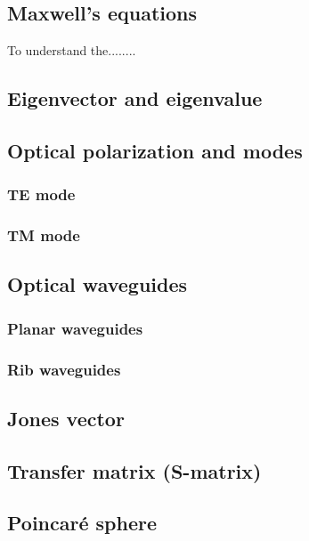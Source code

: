 \documentclass[../report.tex]{subfiles}
\begin{document}
		\subsection{Maxwell's equations}
To understand the........
		\subsection{Eigenvector and eigenvalue}
				
		\subsection{Optical polarization and modes}
			
			\subsubsection{TE mode}
						
			\subsubsection{TM mode}
			
		\subsection{Optical waveguides}
			
			\subsubsection{Planar waveguides}
			
			\subsubsection{Rib waveguides}			
		
		\subsection{Jones vector}
		
		\subsection{Transfer matrix (S-matrix)}
		
		\subsection{Poincaré sphere}
		
\end{document}
